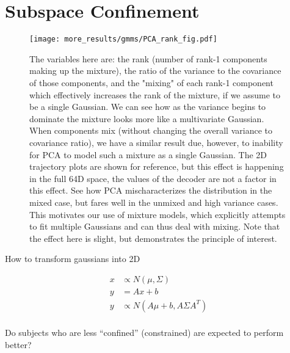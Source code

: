 \documentclass[../main.tex]{subfiles}
\begin{document}
\section{Subspace Confinement}

\begin{figure}[tph]
  \centering
    \texttt{[image: more\_results/gmms/PCA\_rank\_fig.pdf]}
    \caption[Explanatory Mixture Model]{The variables here are: the rank (number of rank-1 components making up the mixture), the ratio of the variance to the covariance of those components, and the "mixing" of each rank-1 component which effectively increases the rank of the mixture, if we assume to be a single Gaussian. We can see how as the variance begins to dominate the mixture looks more like a multivariate Gaussian. When components mix (without changing the overall variance to covariance ratio), we have a similar result due, however, to inability for PCA to model such a mixture as a single Gaussian. The 2D trajectory plots are shown for reference, but this effect is happening in the full 64D space, the values of the decoder are not a factor in this effect. See how PCA mischaracterizes the distribution in the mixed case, but fares well in the unmixed and high variance cases. This motivates our use of mixture models, which explicitly attempts to fit multiple Gaussians and can thus deal with mixing. Note that the effect here is slight, but demonstrates the principle of interest.}\label{fig:toy_model}
\end{figure}
  
How to transform gaussians into 2D
  
\begin{align}
    x &\propto N(\mu, \Sigma) \\ 
    y &= Ax + b \\ 
  y &\propto N(A\mu + b, A\Sigma A^T) \\ 
\end{align}

Do subjects who are less “confined” (constrained) are expected to perform better?



\end{document}
